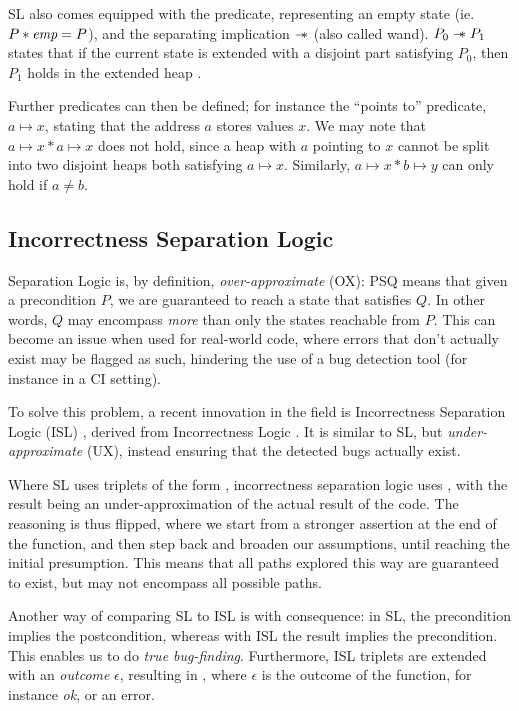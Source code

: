 SL also comes equipped with the \emp{} predicate, representing an empty state (ie. $P * \textit{emp} = P$), and the separating implication $\mathrel{-\!\!\ast}$ (also called wand). $P_0 \mathrel{-\!\!\ast} P_1$ states that if the current state is extended with a disjoint part satisfying $P_0$, then $P_1$ holds in the extended heap \cite{seplogic2}.

Further predicates can then be defined; for instance the ``points to'' predicate, $a \mapsto x$, stating that the address $a$ stores values $x$. We may note that $a \mapsto x * a \mapsto x$ does not hold, since a heap with $a$ pointing to $x$ cannot be split into two disjoint heaps both satisfying $a \mapsto x$. Similarly, $a\mapsto x * b \mapsto y$ can only hold if $a\neq b$.

\subsection{Incorrectness Separation Logic}

Separation Logic is, by definition, \emph{over-approximate} (OX): \SLtriple PSQ means that given a precondition $P$, we are guaranteed to reach a state that satisfies $Q$. In other words, $Q$ may encompass \emph{more} than only the states reachable from $P$. This can become an issue when used for real-world code, where errors that don't actually exist may be flagged as such, hindering the use of a bug detection tool (for instance in a CI setting).

To solve this problem, a recent innovation in the field is Incorrectness Separation Logic (ISL) \cite{isl}, derived from Incorrectness Logic \cite{incorrectnesslogic}. It is similar to SL, but \emph{under-approximate} (UX), instead ensuring that the detected bugs actually exist.

Where SL uses triplets of the form , incorrectness separation logic uses , with the result being an under-approximation of the actual result of the code. The reasoning is thus flipped, where we start from a stronger assertion at the end of the function, and then step back and broaden our assumptions, until reaching the initial presumption. This means that all paths explored this way are guaranteed to exist, but may not encompass all possible paths.

Another way of comparing SL to ISL is with consequence: in SL, the precondition implies the postcondition, whereas with ISL the result implies the precondition. This enables us to do \emph{true bug-finding}. Furthermore, ISL triplets are extended with an \emph{outcome} $\epsilon$, resulting in , where $\epsilon$ is the outcome of the function, for instance \textit{ok}, or an error.

